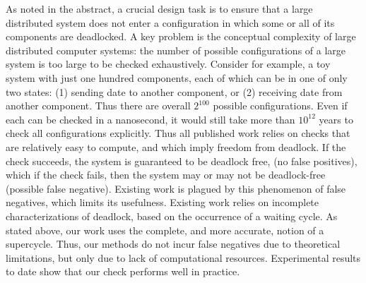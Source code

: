 As noted in the abstract, a crucial design task is to ensure that a large distributed system does not enter a configuration in which some or all of
its components are deadlocked. 
A key problem is the conceptual complexity of large distributed computer systems: the number of possible configurations of a large system is 
too large to be checked exhaustively. Consider for example, a toy system with just one hundred components, each of which can be in
one of only two states: (1) sending date to another component, or (2) receiving date from another component. Thus there are overall $2^{100}$ possible
configurations. Even if each can be checked in a nanosecond, it would still take more than $10^{12}$ years to check all configurations explicitly.
%
Thus all published work relies on checks that are 
relatively easy to compute, and which imply freedom from deadlock. If the check succeeds, the system is guaranteed to be deadlock free, (no false
positives), which if the check fails, then the system may or may not be deadlock-free (possible false negative).  Existing work is plagued by this
phenomenon of false negatives, which limits its usefulness.
%
Existing work relies on incomplete characterizations of deadlock, based on the occurrence of a waiting cycle. 
As stated above, our work uses the complete, and more accurate, notion of a supercycle. Thus, our methods do not incur false negatives due to 
theoretical limitations, but only due to lack of computational resources. Experimental results to date show that our check performs well in practice.



%








